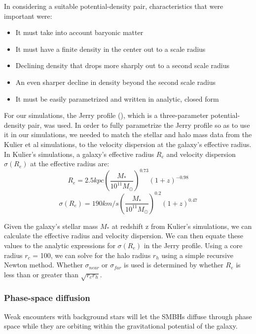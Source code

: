 \documentclass[english, apj]{emulateapj}
\begin{document}
In considering a suitable potential-density pair, characteristics that were important were:
\begin{itemize}
\item It must take into account baryonic matter
\item It must have a finite density in the center out to a scale radius
\item Declining density that drops more sharply out to a second scale radius
\item An even sharper decline in density beyond the second scale radius
\item It must be easily parametrized and written in analytic, closed form
\end{itemize}

For our simulations, the Jerry profile (\citet{2015ApJ...806L..28S}), which is a three-parameter potential-density pair, was used.  In order to fully parametrize the Jerry profile so as to use it in our simulations, we needed to match the stellar and halo mass data from the Kulier et al simulations, to the velocity dispersion at the galaxy's effective radius.  In Kulier's simulations, a galaxy's effective radius $R_{e}$ and velocity dispersion $\sigma(R_e)$ at the effective radius are:
\begin{equation} \label{re}
R_{e} = 2.5 kpc\left(\frac{M_*}{10^{11}M_{\odot}}\right)^{0.73}(1+z)^{-0.98}
\end{equation}
\begin{equation} \label{sig}
\sigma(R_{e}) = 190km/s\left(\frac{M_{*}}{10^{11}M_{\odot}}\right)^{0.2}(1+z)^{0.47}
\end{equation}

Given the galaxy's stellar mass $M_{*}$ at redshift z from Kulier's simulations, we can calculate the effective radius and velocity dispersion.  We can then equate these values to the analytic expressions for $\sigma(R_{e})$ in the Jerry profile.  Using a core radius $r_c$ = 100, we can solve for the halo radius $r_h$ using a simple recursive Newton method.  Whether $\sigma_{near}$ or $\sigma_{far}$ is used is determined by whether $R_e$ is less than or greater than $\sqrt{r_c r_h}$.

\subsubsection{Phase-space diffusion}
Weak encounters with background stars will let the SMBHs diffuse through phase space while they are orbiting within the gravitational potential of the galaxy.
\end{document}
